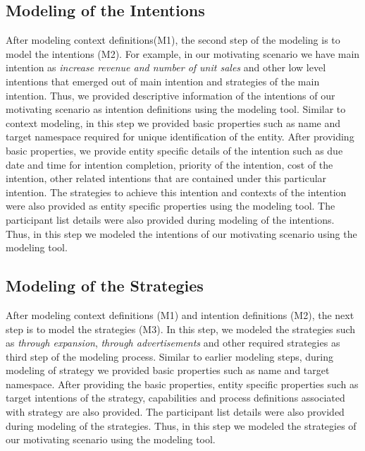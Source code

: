 \subsection{Modeling of the Intentions}
After modeling context definitions(M1), the second step of the modeling is to model the intentions (M2). For example, in our motivating scenario we have main intention as \textit{increase revenue and number of unit sales} and other low level intentions that emerged out of main intention and strategies of the main intention. Thus, we provided descriptive information of the intentions of our motivating scenario as intention definitions using the modeling tool. Similar to context modeling, in this step we provided basic properties such as name and target namespace required for unique identification of the entity. After providing basic properties, we provide entity specific details of the intention such as due date and time for intention completion, priority of the intention, cost of the intention, other related intentions that are contained under this particular intention. The strategies to achieve this intention and contexts of the intention were also provided as entity specific properties using the modeling tool. The participant list details were also provided during modeling of the intentions. Thus, in this step we modeled the intentions of our motivating scenario using the modeling tool. 

\subsection{Modeling of the Strategies}
After modeling context definitions (M1) and intention definitions (M2), the next step is to model the strategies (M3). In this step, we modeled the strategies such as \textit{through expansion}, \textit{through advertisements} and other required strategies as third step of the modeling process. Similar to earlier modeling steps, during modeling of strategy we provided basic properties such as name and target namespace. After providing the basic properties, entity specific properties such as target intentions of the strategy, capabilities and process definitions associated with strategy are also provided. The participant list details were also provided during modeling of the strategies. Thus, in this step we modeled the strategies of our motivating scenario using the modeling tool. 

